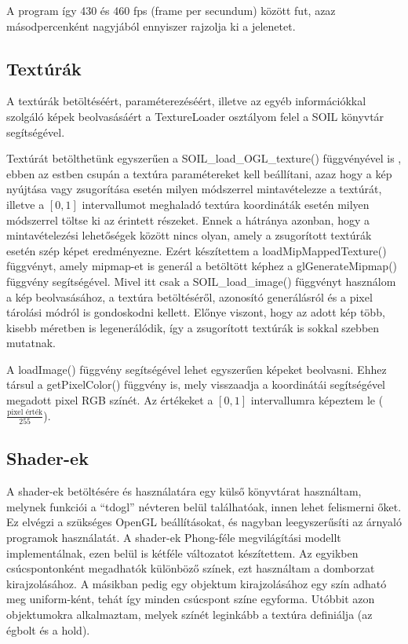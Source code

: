 A program így 430 és 460 fps (frame per secundum) között fut, azaz másodpercenként nagyjából ennyiszer rajzolja ki a jelenetet.

\subsection{Textúrák}
A textúrák betöltéséért, paraméterezéséért, illetve az egyéb információkkal szolgáló képek beolvasásáért a TextureLoader osztályom felel a SOIL könyvtár segítségével. 

Textúrát betölthetünk egyszerűen a SOIL\_load\_OGL\_texture() függvényével is , ebben az estben csupán a textúra paramétereket kell beállítani, azaz hogy a kép nyújtása vagy zsugorítása esetén milyen módszerrel mintavételezze a textúrát, illetve a $[0, 1]$ intervallumot meghaladó textúra koordináták esetén milyen módszerrel töltse ki az érintett részeket. Ennek a hátránya azonban, hogy a mintavételezési lehetőségek között nincs olyan, amely a zsugorított textúrák esetén szép képet eredményezne. Ezért készítettem a loadMipMappedTexture() függvényt, amely mipmap-et is generál a betöltött képhez a glGenerateMipmap() függvény segítségével. Mivel itt csak a SOIL\_load\_image() függvényt használom a kép beolvasásához, a textúra betöltéséről, azonosító generálásról és a pixel tárolási módról is gondoskodni kellett. Előnye viszont, hogy az adott kép több, kisebb méretben is legenerálódik, így a zsugorított textúrák is sokkal szebben mutatnak.

A loadImage() függvény segítségével lehet egyszerűen képeket beolvasni. Ehhez társul a getPixelColor() függvény is, mely visszaadja a koordinátái segítségével megadott pixel RGB színét. Az értékeket a $[0, 1]$ intervallumra képeztem le ($\frac{\text{pixel érték}}{255}$).

\subsection{Shader-ek}
A shader-ek betöltésére és használatára egy külső könyvtárat használtam, melynek funkciói a ``tdogl'' névteren belül találhatóak, innen lehet felismerni őket. Ez elvégzi a szükséges OpenGL beállításokat, és nagyban leegyszerűsíti az árnyaló programok használatát. A shader-ek Phong-féle megvilágítási modellt implementálnak, ezen belül is kétféle változatot készítettem. Az egyikben csúcspontonként megadhatók különböző színek, ezt használtam a domborzat kirajzolásához. A másikban pedig egy objektum kirajzolásához egy szín adható meg uniform-ként, tehát így minden csúcspont színe egyforma. Utóbbit azon objektumokra alkalmaztam, melyek színét leginkább a textúra definiálja (az égbolt és a hold).

